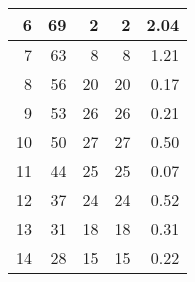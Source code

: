 \begin{table}[H]
\begin{tabular}{|r|r|r|r|r|}
\hline
6  & 69                                                              & 2                                                               & 2                                                                   & 2.04                                                  \\ 
\hline
7  & 63                                                              & 8                                                               & 8                                                                   & 1.21                                                  \\ 
\hline
8  & 56                                                              & 20                                                              & 20                                                                  & 0.17                                                  \\ 
\hline
9  & 53                                                              & 26                                                              & 26                                                                  & 0.21                                                  \\ 
\hline
10 & 50                                                              & 27                                                              & 27                                                                  & 0.50                                                  \\ 
\hline
11 & 44                                                              & 25                                                              & 25                                                                  & 0.07                                                  \\ 
\hline
12 & 37                                                              & 24                                                              & 24                                                                  & 0.52                                                  \\ 
\hline
13 & 31                                                              & 18                                                              & 18                                                                  & 0.31                                                  \\ 
\hline
14 & 28                                                              & 15                                                              & 15                                                                  & 0.22                                                  \\ 

\end{tabular}
\end{table}
